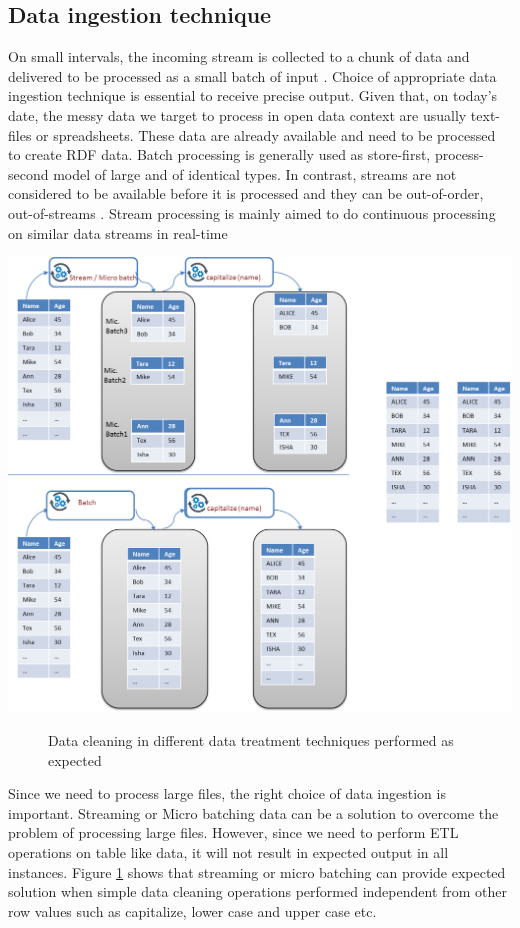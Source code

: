 \subsection{Data ingestion technique}
On small intervals, the incoming stream is collected to a chunk of data and delivered to be processed as a small batch of input \cite{beyondbatchprocessing}. Choice of appropriate data ingestion technique is essential to receive precise output. Given that, on today's date, the messy data we target to process in open data context are usually text-files or spreadsheets. These data are already available and need to be processed to create RDF data. Batch processing is generally used as store-first, process-second model of large and of identical types. In contrast, streams are not considered to be available before it is processed and they can be out-of-order, out-of-streams \cite{beyondbatchprocessing} \cite{Sims-387}. Stream processing is mainly aimed to do continuous processing on similar data streams in real-time \cite{8reqofrealtime} 
\begin{center}
	\includegraphics[width=38em]{./Figures/batch-cleaning-right}
	\begin{figure}[htbp]
    \caption{Data cleaning in different data treatment techniques performed as expected}
    \label{fig:streamcorrect}
	\end{figure}
\end{center}
 Since we need to process large files, the right choice of data ingestion is important. Streaming or Micro batching data can be a solution to overcome the problem of processing large files. However, since we need to perform ETL operations on table like data, it will not result in expected output in all instances. Figure \ref{fig:streamcorrect} shows that streaming or micro batching can provide expected solution when simple data cleaning operations performed independent from other row values such as capitalize, lower case and upper case etc. 
